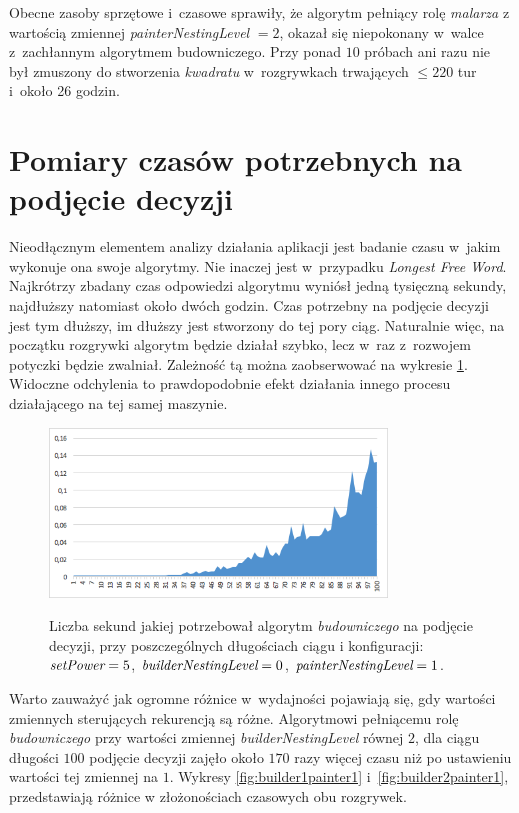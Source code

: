 \documentclass[document]{xmgr}
\begin{document}
Obecne zasoby sprzętowe i~czasowe sprawiły, że algorytm pełniący rolę \emph{malarza} z wartością zmiennej \emph{painterNestingLevel} $=2$, okazał się niepokonany w~walce z~zachłannym algorytmem budowniczego. Przy ponad $10$ próbach ani razu nie był zmuszony do stworzenia \emph{kwadratu} w~rozgrywkach trwających $\leq 220$ tur i~około 26 godzin.



\section{Pomiary czasów potrzebnych na podjęcie decyzji}
Nieodłącznym elementem analizy działania aplikacji jest badanie czasu w~jakim wykonuje ona swoje algorytmy. Nie inaczej jest w~przypadku \emph{Longest Free Word}. Najkrótrzy zbadany czas odpowiedzi algorytmu wyniósł jedną tysięczną sekundy, najdłuższy natomiast około dwóch godzin. Czas potrzebny na podjęcie decyzji jest tym dłuższy, im dłuższy jest stworzony do tej pory ciąg. Naturalnie więc, na początku rozgrywki algorytm będzie działał szybko, lecz w~raz z~rozwojem potyczki będzie zwalniał. Zależność tą można zaobserwować na wykresie \ref{fig:builder0painter1}. Widoczne odchylenia to prawdopodobnie efekt działania innego procesu działającego na tej samej maszynie.

\begin{figure}[tbh]
    \centering
    \caption{Liczba sekund jakiej potrzebował algorytm \emph{budowniczego} na podjęcie decyzji, przy poszczególnych długościach ciągu i konfiguracji: $\emph{setPower}=5$, $\emph{builderNestingLevel}=0$, $\emph{painterNestingLevel}=1$.}
    \includegraphics[width = 0.8\textwidth]{images/timeBuilder0Painter1}
    \label{fig:builder0painter1}
\end{figure}

\newpage
Warto zauważyć jak ogromne różnice w~wydajności pojawiają się, gdy wartości zmiennych sterujących rekurencją są różne. Algorytmowi pełniącemu rolę \emph{budowniczego} przy wartości zmiennej \emph{builderNestingLevel} równej $2$, dla ciągu długości $100$ podjęcie decyzji zajęło około $170$ razy więcej czasu niż po ustawieniu wartości tej zmiennej na $1$. Wykresy \ref{fig:builder1painter1} i~\ref{fig:builder2painter1}, przedstawiają różnice w złożonościach czasowych obu rozgrywek.
\end{document}
